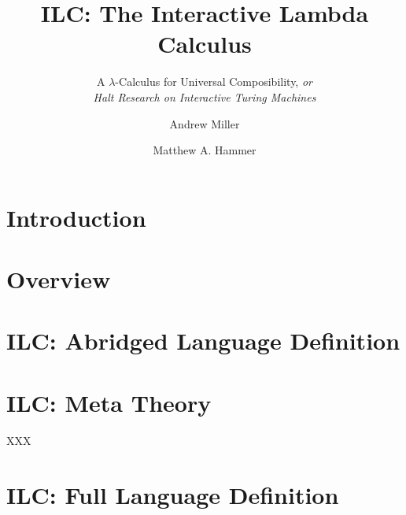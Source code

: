 \documentclass{llncs}
\title{ILC: The Interactive Lambda Calculus}
\subtitle{A $\lambda$-Calculus for Universal Composibility, \emph{or}
  \\
  \emph{Halt Research on Interactive Turing Machines}
}
\author{Andrew Miller\inst{1} \and Matthew A. Hammer\inst{2}}
\institute{University of Illinois \and University of Colorado Boulder}
\begin{document}
\maketitle

\begin{abstract}

\end{abstract}

\section{Introduction}

\section{Overview}

\section{ILC: Abridged Language Definition}

\section{ILC: Meta Theory}

\begin{theorem}
\label{thm:read-det}
XXX
\end{theorem}


\appendix
\section{ILC: Full Language Definition}
\end{document}
